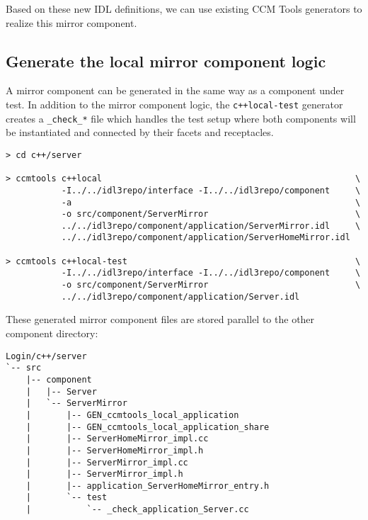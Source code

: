 Based on these new IDL definitions, we can use existing CCM Tools generators to
realize this mirror component.


\subsection{Generate the local mirror component logic}
\label{subsection:GenerateLocalMirrorComponentLogicCxx}
A mirror component can be generated in the same way as a component under test.
In addition to the mirror component logic, the {\tt c++local-test} generator creates
a {\tt \_check\_*} file which handles the test setup where both components will be
instantiated and connected by their facets and receptacles.   

\begin{footnotesize}
\begin{verbatim}
> cd c++/server

> ccmtools c++local                                                  \
           -I../../idl3repo/interface -I../../idl3repo/component     \
           -a                                                        \
           -o src/component/ServerMirror                             \
           ../../idl3repo/component/application/ServerMirror.idl     \
           ../../idl3repo/component/application/ServerHomeMirror.idl

> ccmtools c++local-test                                             \
           -I../../idl3repo/interface -I../../idl3repo/component     \
           -o src/component/ServerMirror                             \
           ../../idl3repo/component/application/Server.idl           
\end{verbatim}
\end{footnotesize}

These generated mirror component files are stored parallel to the other 
component directory:
\begin{footnotesize}
\begin{verbatim}
Login/c++/server
`-- src
    |-- component
    |   |-- Server
    |   `-- ServerMirror
    |       |-- GEN_ccmtools_local_application
    |       |-- GEN_ccmtools_local_application_share
    |       |-- ServerHomeMirror_impl.cc
    |       |-- ServerHomeMirror_impl.h
    |       |-- ServerMirror_impl.cc
    |       |-- ServerMirror_impl.h
    |       |-- application_ServerHomeMirror_entry.h
    |       `-- test
    |           `-- _check_application_Server.cc
\end{verbatim}
\end{footnotesize}



